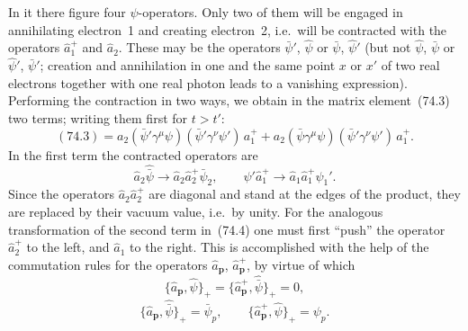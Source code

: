 In it there figure four $\psi$-operators. Only two of them will be engaged in annihilating electron~1 and creating electron~2, i.e.\ will be contracted with the operators $\hat{a}_1^+$ and $\hat{a}_2$. These may be the operators $\bar{\psi}'$, $\hat{\psi}$ or $\bar{\psi}$, $\hat{\psi}'$ (but not $\hat{\psi}$, $\bar{\psi}$ or $\hat{\psi}'$, $\bar{\psi}'$; creation and annihilation in one and the same point $x$ or $x'$ of two real electrons together with one real photon leads to a vanishing expression). Performing the contraction in two ways, we obtain in the matrix element~(74.3) two terms; writing them first for $t > t'$:
\begin{equation}
(74.3) = a_2(\bar{\psi}'\gamma^\mu\psi)(\bar{\psi}'\gamma^\nu\psi')\,a_1^+ + a_2(\bar{\psi}\gamma^\mu\psi)(\bar{\psi}'\gamma^\nu\psi')\,a_1^+.
\tag{74.4}
\end{equation}
In the first term the contracted operators are
\[
\hat{a}_2 \hat{\bar{\psi}} \to \hat{a}_2 \hat{a}_2^+ \bar{\psi}_2,\qquad \hat{\psi}' \hat{a}_1^+ \to \hat{a}_1 \hat{a}_1^+ \psi_1'.
\]
Since the operators $\hat{a}_2 \hat{a}_2^+$ are diagonal and stand at the edges of the product, they are replaced by their vacuum value, i.e.\ by unity. For the analogous transformation of the second term in~(74.4) one must first ``push'' the operator $\hat{a}_2^+$ to the left, and $\hat{a}_1$ to the right. This is accomplished with the help of the commutation rules for the operators $\hat{a}_\mathbf{p}$, $\hat{a}_\mathbf{p}^+$, by virtue of which
\begin{equation}
\{\hat{a}_\mathbf{p}, \hat{\psi}\}_+ = \{\hat{a}_\mathbf{p}^+, \hat{\bar{\psi}}\}_+ = 0,
\tag{74.5}
\end{equation}
\[
\{\hat{a}_\mathbf{p}, \hat{\bar{\psi}}\}_+ = \bar{\psi}_p,\qquad \{\hat{a}_\mathbf{p}^+, \hat{\psi}\}_+ = \psi_p.
\]

